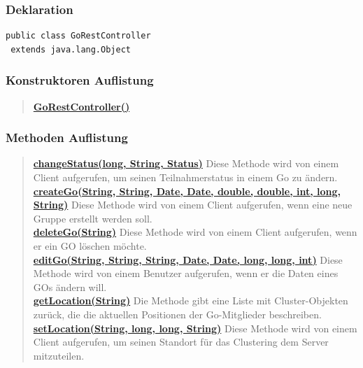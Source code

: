 \documentclass[11pt,a4paper]{article}
\begin{document}
{{{{{{{{{{{{{{{{{\subsubsection{Deklaration}{
\begin{lstlisting}[frame=none]
public class GoRestController
 extends java.lang.Object\end{lstlisting}
\subsubsection{Konstruktoren Auflistung}{
\begin{verse}
\hyperlink{edu.kit.pse17.go_app.ClientCommunication.Upstream.GoRestController()}{{\bf GoRestController()}} \\
\end{verse}
}
\subsubsection{Methoden Auflistung}{
\begin{verse}
\hyperlink{edu.kit.pse17.go_app.ClientCommunication.Upstream.GoRestController.changeStatus(long, java.lang.String, edu.kit.pse17.go_app.PersistenceLayer.Status)}{{\bf changeStatus(long, String, Status)}} Diese Methode wird von einem Client aufgerufen, um seinen Teilnahmerstatus in einem Go zu ändern.\\
\hyperlink{edu.kit.pse17.go_app.ClientCommunication.Upstream.GoRestController.createGo(java.lang.String, java.lang.String, java.util.Date, java.util.Date, double, double, int, long, java.lang.String)}{{\bf createGo(String, String, Date, Date, double, double, int, long, String)}} Diese Methode wird von einem Client aufgerufen, wenn eine neue Gruppe erstellt werden soll.\\
\hyperlink{edu.kit.pse17.go_app.ClientCommunication.Upstream.GoRestController.deleteGo(java.lang.String)}{{\bf deleteGo(String)}} Diese Methode wird von einem Client aufgerufen, wenn er ein GO löschen möchte.\\
\hyperlink{edu.kit.pse17.go_app.ClientCommunication.Upstream.GoRestController.editGo(java.lang.String, java.lang.String, java.lang.String, java.util.Date, java.util.Date, long, long, int)}{{\bf editGo(String, String, String, Date, Date, long, long, int)}} Diese Methode wird von einem Benutzer aufgerufen, wenn er die Daten eines GOs ändern will.\\
\hyperlink{edu.kit.pse17.go_app.ClientCommunication.Upstream.GoRestController.getLocation(java.lang.String)}{{\bf getLocation(String)}} Die Methode gibt eine Liste mit Cluster-Objekten zurück, die die aktuellen Positionen der Go-Mitglieder beschreiben.\\
\hyperlink{edu.kit.pse17.go_app.ClientCommunication.Upstream.GoRestController.setLocation(java.lang.String, long, long, java.lang.String)}{{\bf setLocation(String, long, long, String)}} Diese Methode wird von einem Client aufgerufen, um seinen Standort für das Clustering dem Server mitzuteilen.\\
\end{verse}
}
}}}}}}}}}}}}}}}}}}
\end{document}
